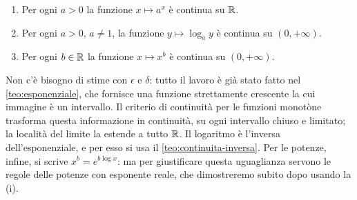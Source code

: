 \begin{teorema}\label{teo:continuita-esponenziale}
\begin{enumerate}[label=\textup{(\roman*)}]
  \item Per ogni $a>0$ la funzione $x\mapsto a^{x}$ è continua su $\mathbb{R}$.
  \item Per ogni $a>0$, $a\neq1$, la funzione $y\mapsto\log_{a}y$ è continua su $(0,+\infty)$.
  \item Per ogni $b\in\mathbb{R}$ la funzione $x\mapsto x^{b}$ è continua su $(0,+\infty)$.
\end{enumerate}
\end{teorema}

\begin{schema}
\end{schema}

\begin{strategia}
Non c'è bisogno di stime con $\epsilon$ e $\delta$: tutto il lavoro è già stato fatto
nel \cref{teo:esponenziale}, che fornisce una funzione strettamente crescente la cui
immagine è un intervallo. Il criterio di continuità per le funzioni monotòne trasforma
questa informazione in continuità, su ogni intervallo chiuso e limitato; la località del
limite la estende a tutto $\mathbb{R}$. Il logaritmo è l'inversa dell'esponenziale, e per esso
si usa il \cref{teo:continuita-inversa}. Per le potenze, infine, si scrive
$x^{b}=e^{b\log x}$: ma per giustificare questa uguaglianza servono le regole delle
potenze con esponente reale, che dimostreremo subito dopo usando la (i).
\end{strategia}

